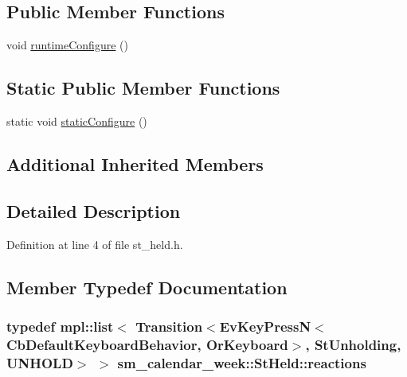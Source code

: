 \subsection*{Public Member Functions}
\begin{DoxyCompactItemize}
\item 
void \hyperlink{structsm__calendar__week_1_1StHeld_a9f0880b1346612900c97abd64cb422e1}{runtime\+Configure} ()
\end{DoxyCompactItemize}
\subsection*{Static Public Member Functions}
\begin{DoxyCompactItemize}
\item 
static void \hyperlink{structsm__calendar__week_1_1StHeld_a46541f4633aca2acee83cd7510002822}{static\+Configure} ()
\end{DoxyCompactItemize}
\subsection*{Additional Inherited Members}


\subsection{Detailed Description}


Definition at line 4 of file st\+\_\+held.\+h.



\subsection{Member Typedef Documentation}
\subsubsection[{\texorpdfstring{reactions}{reactions}}]{\setlength{\rightskip}{0pt plus 5cm}typedef mpl\+::list$<$ Transition$<$Ev\+Key\+PressN$<$Cb\+Default\+Keyboard\+Behavior, {\bf Or\+Keyboard}$>$, {\bf St\+Unholding}, {\bf U\+N\+H\+O\+LD}$>$ $>$ {\bf sm\+\_\+calendar\+\_\+week\+::\+St\+Held\+::reactions}}\hypertarget{structsm__calendar__week_1_1StHeld_af2d1560fc1136fde91397dfd2abc8ab1}{}\label{structsm__calendar__week_1_1StHeld_af2d1560fc1136fde91397dfd2abc8ab1}


